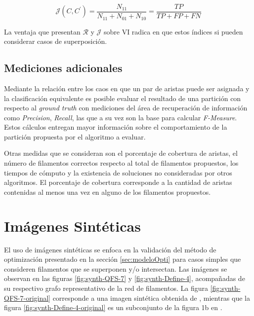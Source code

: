 \begin{equation}
\mathcal{J}(C,C^{\prime}) = \frac{N_{11}}{N_{11} + N_{01} + N_{10}} = \frac{TP}{TP + FP + FN}
\label{eq:JaccardIndex}
\end{equation}

La ventaja que presentan $\mathcal{R}$ y $\mathcal{J}$ sobre VI radica en que estos \'indices si pueden considerar casos de superposici\'on.

\subsection{Mediciones adicionales}

Mediante la relaci\'on entre los caos en que un par de aristas puede ser asignada y la clasificaci\'on equivalente es posible evaluar el resultado de una partici\'on con respecto al {\it ground truth} con mediciones del \'area de recuperaci\'on de informaci\'on como {\it Precision}, {\it Recall}, las que a su vez son la base para calcular {\it F-Measure}.
Estos c\'alculos entregan mayor informaci\'on sobre el comportamiento de la partici\'on propuesta por el algoritmo a evaluar. 


Otras medidas que se consideran son el porcentaje de cobertura de aristas, el n\'umero de filamentos correctos respecto al total de filamentos propuestos, los tiempos de c\'omputo y la existencia de soluciones no consideradas por otros algoritmos. El porcentaje de cobertura corresponde a la cantidad de aristas contenidas al menos una vez en alguno de los filamentos propuestos.

\section{Im\'agenes Sint\'eticas}

El uso de im\'agenes sint\'eticas se enfoca en la validaci\'on del m\'etodo de optimizaci\'on presentado en la secci\'on \ref{sec:modeloOpti} para casos simples que consideren filamentos que se superponen y/o intersectan. Las im\'agenes se observan en las figuras \ref{fig:synth-QFS-7} y \ref{fig:synth-Define-4}, acompa\~nadas de su respectivo grafo representativo de la red de filamentos. La figura \ref{fig:synth-QFS-7-original} corresponde a una imagen sint\'etica obtenida de \cite{qiu2014quantitative}, mientras que la figura \ref{fig:synth-Define-4-original} es un subconjunto de la figura 1b  en \cite{breuer2015define}.

